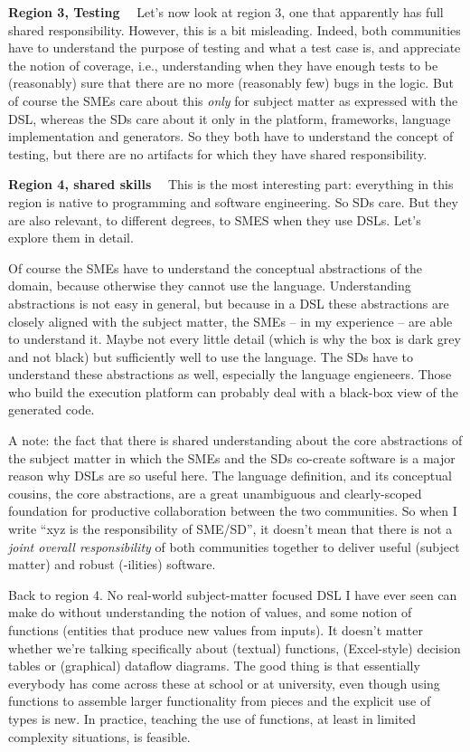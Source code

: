 \documentclass[runningheads]{llncs}
\newcommand\parhead[1]{\vspace{1mm}\noindent\textbf{{#1}}\ \ }
\begin{document}
\parhead{Region 3, Testing} Let's now look at region 3, one that apparently has
full shared responsibility. However, this is a bit misleading. Indeed, both
communities have to understand the purpose of testing and what a test case is,
and appreciate the notion of coverage, i.e., understanding when they have enough
tests to be (reasonably) sure that there are no more (reasonably few) bugs in
the logic. But of course the SMEs care about this \emph{only} for subject matter
as expressed with the DSL, whereas the SDs care about it only in the platform,
frameworks, language implementation and generators. So they both have to
understand the concept of testing, but there are no artifacts for which they
have shared responsibility.

\parhead{Region 4, shared skills} This is the most interesting
part: everything in this region is native to programming and software
engineering. So SDs care. But they are also relevant, to different degrees, to
SMES when they use DSLs. Let's explore them in detail.

Of course the SMEs have to understand the conceptual abstractions of the domain,
because otherwise they cannot use the language.
Understanding abstractions is not easy in general, but because in a DSL these
abstractions are closely aligned with the subject matter, the SMEs -- in my
experience -- are able to understand it. Maybe not every little detail (which is
why the box is dark grey and not black) but sufficiently well to use the
language. The SDs have to understand these abstractions as well, especially the
language engieneers. Those who build the execution platform can probably deal
with a black-box view of the generated code.

A note: the fact that there is shared understanding about the core abstractions
of the subject matter in which the SMEs and the SDs co-create software is a major
reason why DSLs are so useful here. The language definition, and its conceptual
cousins, the core abstractions, are a great unambiguous and clearly-scoped
foundation for productive collaboration between the two communities. So when
I write ``xyz is the responsibility of SME/SD'', it doesn't mean that there is 
not a \emph{joint overall responsibility} of both communities together to deliver
useful (subject matter) and robust (-ilities) software. 

Back to region 4. No real-world subject-matter focused DSL I have ever seen can
make do without understanding the notion of values, and some notion of functions
(entities that produce new values from inputs). It doesn't matter whether we're
talking specifically about (textual) functions, (Excel-style) decision tables or
(graphical) dataflow diagrams. The good thing is that essentially everybody has
come across these at school or at university, even
though using functions to assemble larger functionality from pieces and the explicit
use of types is new. In practice, teaching the use of functions, at least
in limited complexity situations, is feasible. 
\end{document}

